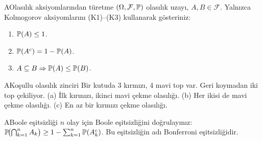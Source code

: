 \begin{alistirma}[Al.2.5]{A}{Olasılık aksiyomlarından türetme}
$(\Omega,\mathcal{F},\mathbb{P})$ olasılık uzayı, $A, B \in \mathcal{F}$.
Yalnızca Kolmogorov aksiyomlarını (K1)--(K3) kullanarak gösteriniz:
\begin{enumerate}[label=(\alph*)]
  \item $\mathbb{P}(A) \leq 1$.
  \item $\mathbb{P}(A^c) = 1 - \mathbb{P}(A)$.
  \item $A \subseteq B \Rightarrow \mathbb{P}(A) \leq \mathbb{P}(B)$.
\end{enumerate}
\end{alistirma}
\begin{alistirma}[Al.2.6]{A}{Koşullu olasılık zinciri}
Bir kutuda 3 kırmızı, 4 mavi top var. Geri koymadan iki top çekiliyor.
(a) İlk kırmızı, ikinci mavi çekme olasılığı.
(b) Her ikisi de mavi çekme olasılığı.
(c) En az bir kırmızı çekme olasılığı.
\end{alistirma}
\alistirmalar



\begin{alistirma}[Al.2.7]{A}{Boole eşitsizliği}
$n$ olay için Boole eşitsizliğini doğrulayınız:
$\mathbb{P}\!\bigl(\bigcap_{k=1}^n A_k\bigr) \geq 1 - \sum_{k=1}^n \mathbb{P}(A_k^c)$.
Bu eşitsizliğin adı Bonferroni eşitsizliğidir.
\end{alistirma}

